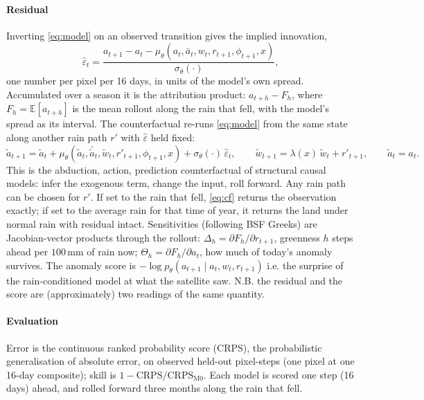 \documentclass{article}
\begin{document}
\paragraph{Residual} Inverting \eqref{eq:model} on an observed transition gives the implied innovation,
\begin{equation}
\hat\varepsilon_t = \frac{a_{t+1} - a_t - \mu_\theta(a_t,\bar a_t,w_t,r_{t+1},\phi_{t+1},x)}{\sigma_\theta(\cdot)},
\label{eq:implied}
\end{equation}
one number per pixel per 16 days, in units of the model's own spread. Accumulated over a season it is the attribution product: $a_{t+h}-F_h$, where $F_h=\mathbb E[a_{t+h}]$ is the mean rollout along the rain that fell, with the model's spread as its interval. The counterfactual re-runs \eqref{eq:model} from the same state along another rain path $r'$ with $\hat\varepsilon$ held fixed:
\begin{equation}
\tilde a_{t+1} = \tilde a_t + \mu_\theta(\tilde a_t,\bar{\tilde a}_t,\tilde w_t,r'_{t+1},\phi_{t+1},x) + \sigma_\theta(\cdot)\,\hat\varepsilon_t,\qquad \tilde w_{t+1}=\lambda(x)\,\tilde w_t + r'_{t+1},\qquad \tilde a_t = a_t.
\label{eq:cf}
\end{equation}
This is the abduction, action, prediction counterfactual of structural causal models: infer the exogenous term, change the input, roll forward. Any rain path can be chosen for $r'$. If set to the rain that fell, \eqref{eq:cf} returns the observation exactly; if set to the average rain for that time of year, it returns the land under normal rain with residual intact. Sensitivities (following BSF Greeks) are Jacobian-vector products through the rollout: $\Delta_h=\partial F_h/\partial r_{t+1}$, greenness $h$ steps ahead per $100$\,mm of rain now; $\Theta_h=\partial F_h/\partial a_t$, how much of today's anomaly survives. The anomaly score is $-\log p_\theta(a_{t+1}\mid a_t,w_t,r_{t+1})$ i.e. the surprise of the rain-conditioned model at what the satellite saw. N.B. the residual and the score are (approximately) two readings of the same quantity.

\paragraph{Evaluation} Error is the continuous ranked probability score (CRPS), the probabilistic generalisation of absolute error, on observed held-out pixel-steps (one pixel at one 16-day composite); skill is $1-\mathrm{CRPS}/\mathrm{CRPS}_{\mathrm{M0}}$. Each model is scored one step (16 days) ahead, and rolled forward three months along the rain that fell.
\end{document}
